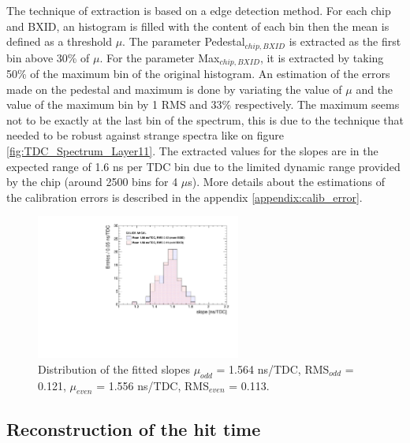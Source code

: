 \documentclass[twoside,a4paper,11pt]{article}
\begin{document}
The technique of extraction is based on a edge detection method. For each chip and BXID, an histogram is filled with the content of each bin then the mean is defined as a threshold $\mu$. The parameter Pedestal$_{chip, BXID}$ is extracted as the first bin above 30\% of $\mu$. For the parameter Max$_{chip, BXID}$, it is extracted by taking 50\% of the maximum bin of the original histogram. An estimation of the errors made on the pedestal and maximum is done by variating the value of $\mu$ and the value of the maximum bin by 1 RMS and 33\% respectively. The maximum seems not to be exactly at the last bin of the spectrum, this is due to the technique that needed to be robust against strange spectra like on figure \ref{fig:TDC_Spectrum_Layer11}.
The extracted values for the slopes are in the expected range of 1.6 ns per TDC bin due to the limited dynamic range provided by the chip (around 2500 bins for 4 $\mu$s). More details about the estimations of the calibration errors is described in the appendix \ref{appendix:calib_error}.
\begin{figure}[htbp]
\begin{center}
\includegraphics[width=0.6\textwidth]{fig/SlopesTDC.pdf}
\caption{Distribution of the fitted slopes $\mu_{odd}$ = 1.564 ns/TDC, RMS$_{odd}$ = 0.121, $\mu_{even}$ = 1.556 ns/TDC, RMS$_{even}$ = 0.113.}
\label{fig:slope_time}
\end{center}
\end{figure}

\subsection{Reconstruction of the hit time}
\end{document}
